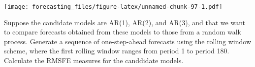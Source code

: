 \documentclass[
  12pt,
  oneside]{book}
\newenvironment{Shaded}{\begin{snugshade}}{\end{snugshade}}
\newcommand{\AttributeTok}[1]{\textcolor[rgb]{0.77,0.63,0.00}{#1}}
\newcommand{\ConstantTok}[1]{\textcolor[rgb]{0.00,0.00,0.00}{#1}}
\newcommand{\ControlFlowTok}[1]{\textcolor[rgb]{0.13,0.29,0.53}{\textbf{#1}}}
\newcommand{\DecValTok}[1]{\textcolor[rgb]{0.00,0.00,0.81}{#1}}
\newcommand{\FunctionTok}[1]{\textcolor[rgb]{0.00,0.00,0.00}{#1}}
\newcommand{\NormalTok}[1]{#1}
\newcommand{\OtherTok}[1]{\textcolor[rgb]{0.56,0.35,0.01}{#1}}
\newcommand{\SpecialCharTok}[1]{\textcolor[rgb]{0.00,0.00,0.00}{#1}}
\newcommand{\StringTok}[1]{\textcolor[rgb]{0.31,0.60,0.02}{#1}}
\begin{document}
\texttt{[image: forecasting\_files/figure-latex/unnamed-chunk-97-1.pdf]}

Suppose the candidate models are AR(1), AR(2), and AR(3), and that we want to compare forecasts obtained from these models to those from a random walk process. Generate a sequence of one-step-ahead forecasts using the rolling window scheme, where the first rolling window ranges from period 1 to period 180. Calculate the RMSFE measures for the canddidate models.

\begin{Shaded}
\end{Shaded}
\end{document}
